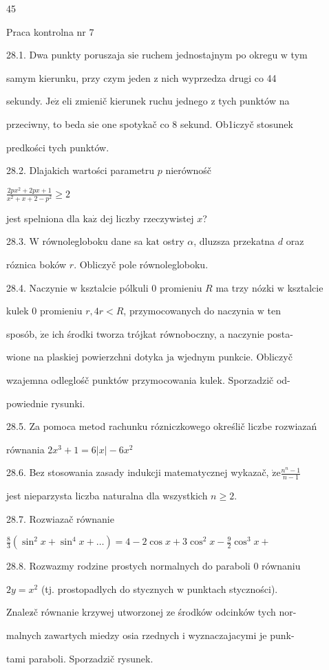 \documentclass[a4paper,12pt]{article}
\begin{document}
45

Praca kontrolna nr 7

28.1. Dwa punkty poruszaja $\mathrm{s}\mathrm{i}\mathrm{e}$ ruchem jednostajnym po okregu $\mathrm{w}$ tym

samym kierunku, przy czym jeden $\mathrm{z}$ nich wyprzedza drugi co 44

sekundy. $\mathrm{J}\mathrm{e}\dot{\mathrm{z}}$ eli zmienič kierunek ruchu jednego $\mathrm{z}$ tych punktów na

przeciwny, to beda $\mathrm{s}\mathrm{i}\mathrm{e}$ one spotykač co 8 sekund. Ob1iczyč stosunek

predkości tych punktów.

28.2. Dlajakich wartości parametru $p$ nierównośč

$\displaystyle \frac{2px^{2}+2px+1}{x^{2}+x+2-p^{2}}\geq 2$

jest spelniona dla $\mathrm{k}\mathrm{a}\dot{\mathrm{z}}$ dej liczby rzeczywistej $x$?

28.3. $\mathrm{W}$ równolegloboku dane sa $\mathrm{k}\mathrm{a}\mathrm{t}$ ostry $\alpha$, dluzsza przekatna $d$ oraz

róznica boków $r$. Obliczyč pole równolegloboku.

28.4. Naczynie $\mathrm{w}$ ksztalcie pólkuli $0$ promieniu $R$ ma trzy nózki $\mathrm{w}$ ksztalcie

kulek $0$ promieniu $r, 4r < R$, przymocowanych do naczynia $\mathrm{w}$ ten

sposób, $\dot{\mathrm{z}}\mathrm{e}$ ich środki tworza trójkat równoboczny, a naczynie posta-

wione na plaskiej powierzchni dotyka $\mathrm{j}\mathrm{a}$ wjednym punkcie. Obliczyč

wzajemna odleglośč punktów przymocowania kulek. Sporzadzič od-

powiednie rysunki.

28.5. Za pomoca metod rachunku rózniczkowego określič liczbe rozwiazań

równania $2x^{3}+1=6|x|-6x^{2}$

28.6. Bez stosowania zasady indukcji matematycznej wykazač, $\dot{\mathrm{z}}\mathrm{e} \displaystyle \frac{n^{n}-1}{n-1}$

jest nieparzysta liczba naturalna dla wszystkich $n\geq 2.$

28.7. Rozwiazač równanie

$\displaystyle \frac{8}{3}(\sin^{2}x+\sin^{4}x+\ldots)=4-2\cos x+3\cos^{2}x-\frac{9}{2}\cos^{3}x+$

28.8. Rozwazmy rodzine prostych normalnych do paraboli $0$ równaniu

$2y = x^{2}$ (tj. prostopadlych do stycznych $\mathrm{w}$ punktach styczności).

Znalez$\acute{}$č równanie krzywej utworzonej ze środków odcinków tych nor-

malnych zawartych miedzy osia rzednych $\mathrm{i}$ wyznaczajacymi je punk-

tami paraboli. Sporzadzič rysunek.
\end{document}
